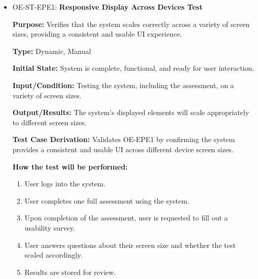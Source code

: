 \documentclass[12pt, titlepage]{article}
\begin{document}
\begin{itemize}

  \item OE-ST-EPE1: \textbf{Responsive Display Across Devices Test}
  \begin{mdframed}[linewidth=0.5mm]
      \textbf{Purpose:} Verifies that the system scales correctly across a variety of screen sizes, providing a consistent and usable UI experience. \par
      \textbf{Type:} Dynamic, Manual \par
      \textbf{Initial State:} System is complete, functional, and ready for user interaction. \par
      \textbf{Input/Condition:} Testing the system, including the assessment, on a variety of screen sizes. \par
      \textbf{Output/Results:} The system's displayed elements will scale appropriately to different screen sizes. \par
      \textbf{Test Case Derivation:} Validates OE-EPE1 by confirming the system provides a consistent and usable UI across different device screen sizes. \par
      \textbf{How the test will be performed:}
      \begin{enumerate}[noitemsep]
        \item User logs into the system.
        \item User completes one full assessment using the system.
        \item Upon completion of the assessment, user is requested to fill out a usability survey.
        \item User answers questions about their screen size and whether the test scaled accordingly.
        \item Results are stored for review.
      \end{enumerate}
  \end{mdframed}


\end{itemize}
\end{document}
